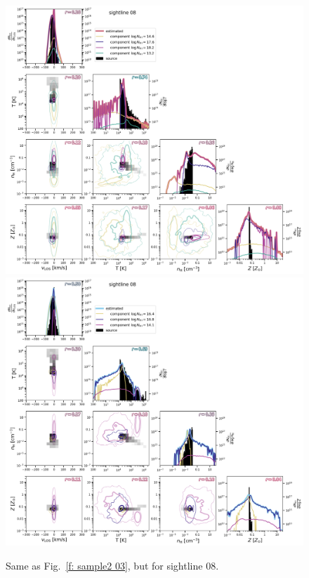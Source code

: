 \documentclass[fleqn,usenatbib]{mnras}
\begin{document}
\begin{figure}
    \centering
    \includegraphics[height=0.45\textheight]{figures/sample2/original/sightline_0008.png}
    \includegraphics[height=0.45\textheight]{figures/sample2/high-z/sightline_0008.png}
    \label{f: sample2 08 corner}
    \caption{Same as Fig.~\ref{f: sample2 03}, but for sightline 08.}
\end{figure}
\end{document}
